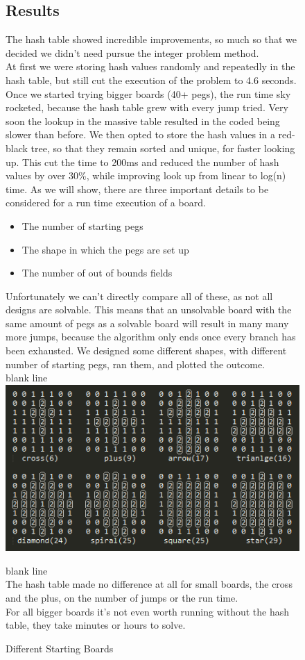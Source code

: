 \documentclass[11pt]{article}
\begin{document}
\newpage
\begin{figure}
\subsection{Results}
The hash table showed incredible improvements, so much so that we decided we didn't need pursue the integer problem method.\\
At first we were storing hash values randomly and repeatedly in the hash table, but still cut the execution of the problem to 4.6 seconds. Once we started trying bigger boards (40+ pegs), the run time sky rocketed, because the hash table grew with every jump tried. Very soon the lookup in the massive table resulted in the coded being slower than before.
We then opted to store the hash values in a red-black tree, so that they remain sorted and unique, for faster looking up.
This cut the time to 200ms and reduced the number of hash values by over 30\%, while improving look up from linear to log(n) time.\newline
As we will show, there are three important details to be considered for a run time execution of a board.
\begin{itemize}
\item The number of starting pegs
\item The shape in which the pegs are set up
\item The number of out of bounds fields
\end{itemize}
Unfortunately we can't directly compare all of these, as not all designs are solvable. This means that an unsolvable board with the same amount of pegs as a solvable board will result in many many more jumps, because the algorithm only ends once every branch has been exhausted.\newline
We designed some different shapes, with different number of starting pegs, ran them, and plotted the outcome.\\
\color{white} blank line\\
\color{black}
\includegraphics[width=12cm]{5}
\caption{Different Starting Boards} 
\label{fig: 5}
\color{white} blank line\\
\color{black}
The hash table made no difference at all for small boards, the cross and the plus, on the number of jumps or the run time.\\
For all bigger boards it's not even worth running without the hash table, they take minutes or hours to solve.\\
\end{figure}
\newpage
\end{document}
